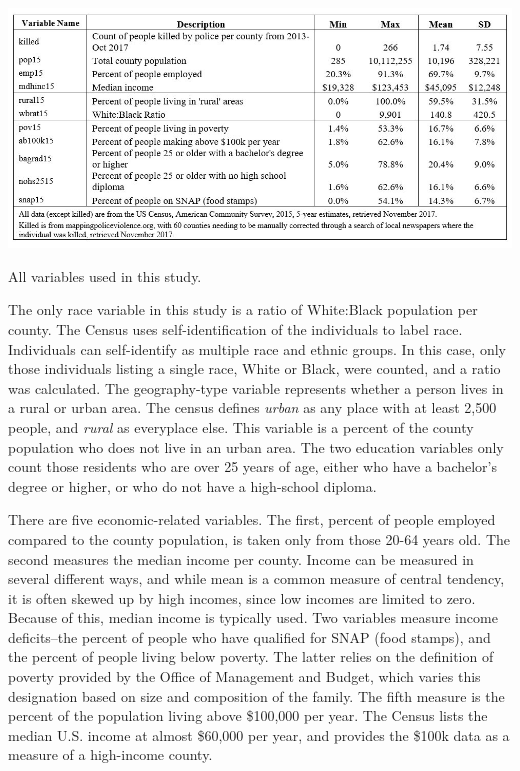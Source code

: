 \documentclass[sigconf]{acmart}
\begin{document}
\begin{table}
\includegraphics[width=1.0\textwidth]{images/table1.jpg}
\caption{All variables used in this study.}
\end{table}

The only race variable in this study is a ratio of White:Black population per county.  The Census uses self-identification of the individuals to label race.  Individuals can self-identify as multiple race and ethnic groups.  In this case, only those individuals listing a single race, White or Black, were counted, and a ratio was calculated.  The geography-type variable represents whether a person lives in a rural or urban area.  The census defines {\em urban} as any place with at least 2,500 people, and {\em rural} as everyplace else.  This variable is a percent of the county population who does not live in an urban area.  The two education variables only count those residents who are over 25 years of age, either who have a bachelor's degree or higher, or who do not have a  high-school diploma.  

There are five economic-related variables.  The first, percent of people employed compared to the county population, is taken only from those 20-64 years old.  The second measures the median income per county.  Income can be measured in several different ways, and while mean is a common measure of central tendency, it is often skewed up by high incomes, since low incomes are limited to zero.  Because of this, median income is typically used.  Two variables measure income deficits--the percent of people who have qualified for SNAP (food stamps), and the percent of people living below poverty.  The latter relies on the definition of poverty provided by the Office of Management and Budget, which varies this designation based on size and composition of the family.  The fifth measure is the percent of the population living above \$100,000  per year. The Census lists the median U.S. income at almost \$60,000 per year, and provides the \$100k data as a measure of a high-income county.
\end{document}
